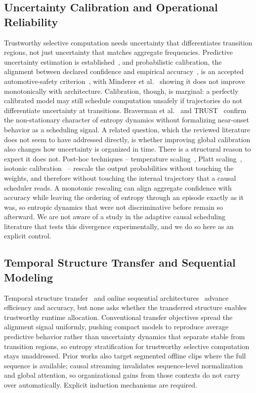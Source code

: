 \documentclass[a4paper,fleqn]{cas-dc}
\begin{document}
\subsection{Uncertainty Calibration and Operational Reliability}
\label{sec:rel_uncertainty}
Trustworthy selective computation needs uncertainty that differentiates transition regions, not just uncertainty that matches aggregate frequencies. Predictive uncertainty estimation is established~\cite{gal2016dropout,lakshminarayanan2017simple,hein2019relu}, and probabilistic calibration, the alignment between declared confidence and empirical accuracy~\cite{guo2017calibration}, is an accepted automotive-safety criterion~\cite{tang2022uv,michelmore2020uq}, with Minderer et al.~\cite{minderer2021revisiting} showing it does not improve monotonically with architecture. Calibration, though, is marginal: a perfectly calibrated model may still schedule computation unsafely if trajectories do not differentiate uncertainty at transitions. Braverman et al.~\cite{braverman2020calib} and TRUST~\cite{dera2023trust} confirm the non-stationary character of entropy dynamics without formalizing near-onset behavior as a scheduling signal.
A related question, which the reviewed literature does not seem to have addressed
directly, is whether improving global calibration also changes how uncertainty is
organized in time. There is a structural reason to expect it does not. Post-hoc
techniques -- temperature scaling~\cite{guo2017calibration}, Platt
scaling~\cite{platt1999probabilistic}, isotonic
calibration~\cite{zadrozny2002isotonic} -- rescale the output probabilities without
touching the weights, and therefore without touching the internal trajectory that a
causal scheduler reads. A monotonic rescaling can align aggregate confidence with
accuracy while leaving the ordering of entropy through an episode exactly as it was,
so entropic dynamics that were not discriminative before remain so afterward. We are
not aware of a study in the adaptive causal scheduling literature that tests this
divergence experimentally, and we do so here as an explicit control.
\subsection{Temporal Structure Transfer and Sequential Modeling}
\label{sec:rel_temporal}
Temporal structure transfer~\cite{hinton2015distilling,bajestani2020tkd,zheng2024tempdistiller} and online sequential architectures~\cite{zhao2022testra,lstr2021} advance efficiency and accuracy, but none asks whether the transferred structure enables trustworthy runtime allocation. Conventional transfer objectives spread the alignment signal uniformly, pushing compact models to reproduce average predictive behavior rather than uncertainty dynamics that separate stable from transition regions, so entropy stratification for trustworthy selective computation stays unaddressed. Prior works also target segmented offline clips where the full sequence is available; causal streaming invalidates sequence-level normalization and global attention, so organizational gains from those contexts do not carry over automatically. Explicit induction mechanisms are required.
\end{document}
